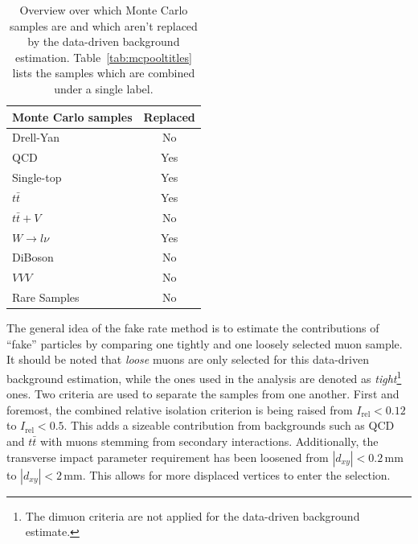 \begin{table}[!htb]
  \centering
  \begin{tabular}{|l|c|}
\hline
Monte Carlo samples & Replaced \\
\hline
Drell-Yan & No \\
QCD & Yes \\
Single-top & Yes \\
$t \bar{t}$ & Yes \\
$t \bar{t} + V$ & No \\
$W \rightarrow l \nu$ & Yes \\
DiBoson & No \\
$VVV$ & No \\
Rare Samples & No \\
\hline
  \end{tabular}
  \caption{Overview over which Monte Carlo samples are and which aren't replaced by the data-driven background estimation. Table~\ref{tab:mcpooltitles} lists the samples which are combined under a single label.}
  \label{tab:fakerate-mc-overview}
\end{table}

The general idea of the fake rate method is to estimate the contributions of ``fake'' particles by comparing one tightly and one loosely selected muon sample. It should be noted that \textit{loose} muons are only selected for this data-driven background estimation, while the ones used in the analysis are denoted as \textit{tight}\footnote{The dimuon criteria are not applied for the data-driven background estimate.} ones. Two criteria are used to separate the samples from one another. First and foremost, the combined relative isolation criterion is being raised from $I_{\text{rel}} < 0.12$ to $I_{\text{rel}} < 0.5$. This adds a sizeable contribution from backgrounds such as QCD and $t \bar{t}$ with muons stemming from secondary interactions. Additionally, the transverse impact parameter requirement has been loosened from $|d_{xy}| < 0.2\,\text{mm}$ to $|d_{xy}| < 2\,\text{mm}$. This allows for more displaced vertices to enter the selection.

